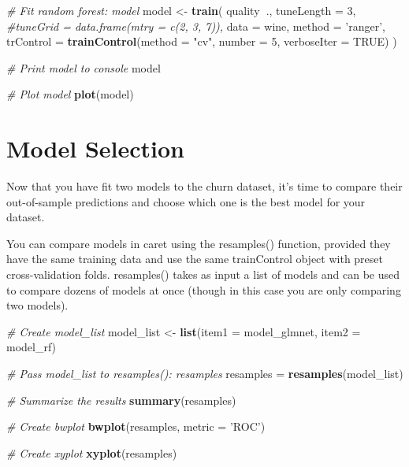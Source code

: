 \documentclass[]{book}
\newenvironment{Shaded}{\begin{snugshade}}{\end{snugshade}}
\newcommand{\KeywordTok}[1]{\textcolor[rgb]{0.13,0.29,0.53}{\textbf{#1}}}
\newcommand{\DataTypeTok}[1]{\textcolor[rgb]{0.13,0.29,0.53}{#1}}
\newcommand{\DecValTok}[1]{\textcolor[rgb]{0.00,0.00,0.81}{#1}}
\newcommand{\StringTok}[1]{\textcolor[rgb]{0.31,0.60,0.02}{#1}}
\newcommand{\CommentTok}[1]{\textcolor[rgb]{0.56,0.35,0.01}{\textit{#1}}}
\newcommand{\OtherTok}[1]{\textcolor[rgb]{0.56,0.35,0.01}{#1}}
\newcommand{\OperatorTok}[1]{\textcolor[rgb]{0.81,0.36,0.00}{\textbf{#1}}}
\newcommand{\NormalTok}[1]{#1}
\theoremstyle{definition}
\theoremstyle{definition}
\theoremstyle{definition}
\theoremstyle{remark}
\begin{document}
\begin{Shaded}
\begin{Highlighting}[]
\CommentTok{# Fit random forest: model}
\NormalTok{model <-}\StringTok{ }\KeywordTok{train}\NormalTok{(}
\NormalTok{  quality}\OperatorTok{~}\NormalTok{.,}
  \DataTypeTok{tuneLength =} \DecValTok{3}\NormalTok{,}
  \CommentTok{#tuneGrid = data.frame(mtry = c(2, 3, 7)),}
  \DataTypeTok{data =}\NormalTok{ wine, }
  \DataTypeTok{method =} \StringTok{'ranger'}\NormalTok{,}
  \DataTypeTok{trControl =} \KeywordTok{trainControl}\NormalTok{(}\DataTypeTok{method =} \StringTok{"cv"}\NormalTok{, }\DataTypeTok{number =} \DecValTok{5}\NormalTok{, }\DataTypeTok{verboseIter =} \OtherTok{TRUE}\NormalTok{)}
\NormalTok{)}

\CommentTok{# Print model to console}
\NormalTok{model}

\CommentTok{# Plot model}
\KeywordTok{plot}\NormalTok{(model)}
\end{Highlighting}
\end{Shaded}

\section{Model Selection}\label{model-selection-1}

Now that you have fit two models to the churn dataset, it's time to
compare their out-of-sample predictions and choose which one is the best
model for your dataset.

You can compare models in caret using the resamples() function, provided
they have the same training data and use the same trainControl object
with preset cross-validation folds. resamples() takes as input a list of
models and can be used to compare dozens of models at once (though in
this case you are only comparing two models).

\begin{Shaded}
\begin{Highlighting}[]
\CommentTok{# Create model_list}
\NormalTok{model_list <-}\StringTok{ }\KeywordTok{list}\NormalTok{(}\DataTypeTok{item1 =}\NormalTok{ model_glmnet, }\DataTypeTok{item2 =}\NormalTok{ model_rf)}

\CommentTok{# Pass model_list to resamples(): resamples}
\NormalTok{resamples =}\StringTok{ }\KeywordTok{resamples}\NormalTok{(model_list)}

\CommentTok{# Summarize the results}
\KeywordTok{summary}\NormalTok{(resamples)}

\CommentTok{# Create bwplot}
\KeywordTok{bwplot}\NormalTok{(resamples, }\DataTypeTok{metric =} \StringTok{'ROC'}\NormalTok{)}

\CommentTok{# Create xyplot}
\KeywordTok{xyplot}\NormalTok{(resamples)}
\end{Highlighting}
\end{Shaded}
\end{document}
